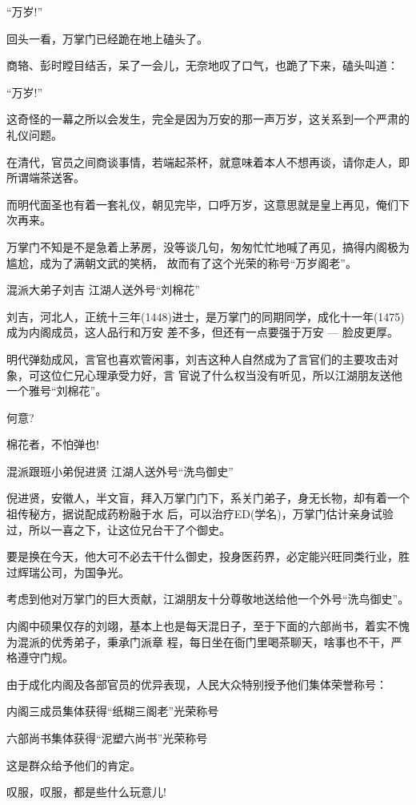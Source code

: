 \documentclass[11pt,a4paper,onecolumn]{article}
\begin{document}
``万岁!''

回头一看，万掌门已经跪在地上磕头了。

商辂、彭时瞠目结舌，呆了一会儿，无奈地叹了口气，也跪了下来，磕头叫道：

``万岁!''

这奇怪的一幕之所以会发生，完全是因为万安的那一声万岁，这关系到一个严肃的礼仪问题。

在清代，官员之间商谈事情，若端起茶杯，就意味着本人不想再谈，请你走人，即所谓端茶送客。

而明代面圣也有着一套礼仪，朝见完毕，口呼万岁，这意思就是皇上再见，俺们下次再来。

万掌门不知是不是急着上茅房，没等谈几句，匆匆忙忙地喊了再见，搞得内阁极为尴尬，成为了满朝文武的笑柄，
故而有了这个光荣的称号``万岁阁老''。

混派大弟子刘吉 江湖人送外号``刘棉花''

刘吉，河北人，正统十三年(1448)进士，是万掌门的同期同学，成化十一年(1475)成为内阁成员，这人品行和万安
差不多，但还有一点要强于万安 --- 脸皮更厚。

明代弹劾成风，言官也喜欢管闲事，刘吉这种人自然成为了言官们的主要攻击对象，可这位仁兄心理承受力好，言
官说了什么权当没有听见，所以江湖朋友送他一个雅号``刘棉花''。

何意?

棉花者，不怕弹也!

混派跟班小弟倪进贤 江湖人送外号``洗鸟御史''

倪进贤，安徽人，半文盲，拜入万掌门门下，系关门弟子，身无长物，却有着一个祖传秘方，据说配成药粉融于水
后，可以治疗ED(学名)，万掌门估计亲身试验过，所以一喜之下，让这位兄台干了个御史。

要是换在今天，他大可不必去干什么御史，投身医药界，必定能兴旺同类行业，胜过辉瑞公司，为国争光。

考虑到他对万掌门的巨大贡献，江湖朋友十分尊敬地送给他一个外号``洗鸟御史''。

内阁中硕果仅存的刘翊，基本上也是每天混日子，至于下面的六部尚书，着实不愧为混派的优秀弟子，秉承门派章
程，每日坐在衙门里喝茶聊天，啥事也不干，严格遵守门规。

由于成化内阁及各部官员的优异表现，人民大众特别授予他们集体荣誉称号：

内阁三成员集体获得``纸糊三阁老''光荣称号

六部尚书集体获得``泥塑六尚书''光荣称号

这是群众给予他们的肯定。

叹服，叹服，都是些什么玩意儿!

\section[\thesection]{}
\end{document}
